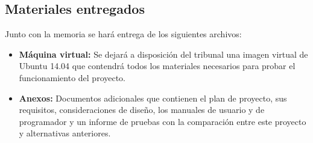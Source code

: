 \subsection{Materiales entregados}
Junto con la memoria se hará entrega de los siguientes archivos:
	\begin{itemize}
	\item \textbf{Máquina virtual:} Se dejará a disposición del tribunal una imagen virtual de Ubuntu 14.04 que contendrá todos los materiales necesarios para probar el funcionamiento del proyecto.
	\item \textbf{Anexos:} Documentos adicionales que contienen el plan de proyecto, sus requisitos, consideraciones de diseño, los manuales de usuario y de programador y un informe de pruebas con la comparación entre este proyecto y alternativas anteriores.
	\end{itemize}
